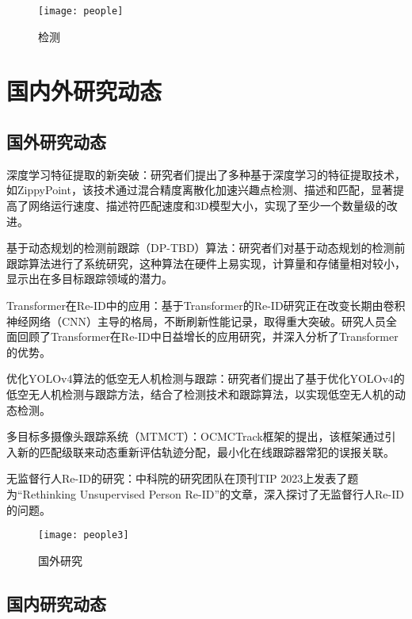 \begin{figure}[htbp] %
	\centering
	\texttt{[image: people]} %
	\caption{检测} %
	\label{fig:people} %
\end{figure}


\section{国内外研究动态}

\subsection{国外研究动态}

深度学习特征提取的新突破：研究者们提出了多种基于深度学习的特征提取技术，如ZippyPoint，该技术通过混合精度离散化加速兴趣点检测、描述和匹配，显著提高了网络运行速度、描述符匹配速度和3D模型大小，实现了至少一个数量级的改进。

基于动态规划的检测前跟踪（DP-TBD）算法：研究者们对基于动态规划的检测前跟踪算法进行了系统研究，这种算法在硬件上易实现，计算量和存储量相对较小，显示出在多目标跟踪领域的潜力。

Transformer在Re-ID中的应用：基于Transformer的Re-ID研究正在改变长期由卷积神经网络（CNN）主导的格局，不断刷新性能记录，取得重大突破。研究人员全面回顾了Transformer在Re-ID中日益增长的应用研究，并深入分析了Transformer的优势。

优化YOLOv4算法的低空无人机检测与跟踪：研究者们提出了基于优化YOLOv4的低空无人机检测与跟踪方法，结合了检测技术和跟踪算法，以实现低空无人机的动态检测。

多目标多摄像头跟踪系统（MTMCT）：OCMCTrack框架的提出，该框架通过引入新的匹配级联来动态重新评估轨迹分配，最小化在线跟踪器常犯的误报关联。

无监督行人Re-ID的研究：中科院的研究团队在顶刊TIP 2023上发表了题为“Rethinking Unsupervised Person Re-ID”的文章，深入探讨了无监督行人Re-ID的问题。

\begin{figure}[htbp] %
	\centering
	\texttt{[image: people3]} %
	\caption{国外研究} %
	\label{fig:people3} %
\end{figure}


\subsection{国内研究动态}

